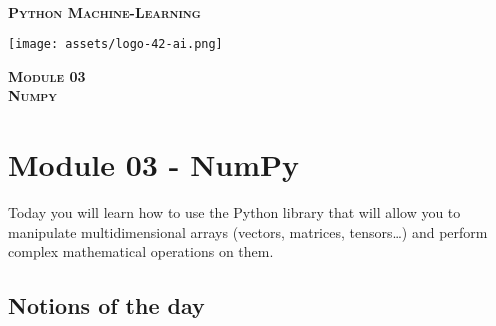 \documentclass[]{article}
\date{}
\begin{document}

\vspace*{2cm}
\begin{center}
    \textsc{\fontsize{40}{48} \bfseries }\\[0.6cm]
    \textsc{\fontsize{39}{48} \bfseries { %
Python Machine-Learning
    }}\\[0.3cm]
\end{center}
\vspace{3cm}

\begin{center}
\texttt{[image: assets/logo-42-ai.png]}{\centering}
\end{center}

\vspace*{2cm}
\begin{center}
    \textsc{\fontsize{32}{48} \bfseries %
Module 03    
    }\\[0.6cm]
    \textsc{\fontsize{32}{48} \bfseries %
Numpy    
    }\\[0.3cm]
\end{center}
\vspace{3cm}

\newpage

\setcounter{page}{1}



\hypertarget{module-03---numpy}{%
\section{Module 03 - NumPy}\label{module-03---numpy}}

Today you will learn how to use the Python library that will allow you
to manipulate multidimensional arrays (vectors, matrices,
tensors\ldots{}) and perform complex mathematical operations on them.

\hypertarget{notions-of-the-day}{%
\subsection{Notions of the day}\label{notions-of-the-day}}
\end{document}
